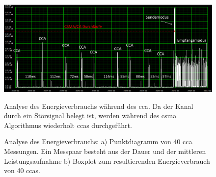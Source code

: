 \begin{figure}[bth]
        \myfloatalign
        {\includegraphics[width=1\linewidth]{gfx/CCA_Stoerer_Power}} 
        \caption[Energiemessung CCA]{Analyse des Energieverbrauchs während des \acs{cca}. Da der Kanal durch ein Störsignal belegt ist, werden während des \acs{csma} Algorithmus wiederholt \acsp{cca} durchgeführt.}\label{fig:power_cca}
\end{figure}

\begin{figure}[bth]
        \myfloatalign
        \caption[Energiemessung CCA]{Analyse des Energieverbrauchs: a) Punktdiagramm von 40 \acs{cca} Messungen. Ein Messpaar besteht aus der Dauer und der mittleren Leistungsaufnahme b) Boxplot zum resultierenden Energieverbrauch von 40 \acsp{cca}.}\label{fig:diag_cca_dauer_leistung}
\end{figure}

